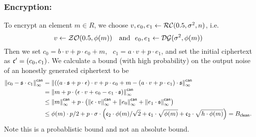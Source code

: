\subsubsection{Encryption:}
To encrypt an element $m\in R$, we choose $v, e_0, e_1 \leftarrow \mathcal{RC}(0.5,\sigma^2,n)$, i.e.
\[
v \leftarrow \mathcal{ZO}(0.5, \phi(m)) ~~~\mbox{and}~~ e_0,e_1 \leftarrow \mathcal{DG}(\sigma^2,\phi(m)) 
\]
Then we set $c_0 = b \cdot v + p \cdot e_0+m$,~ $c_1=a\cdot v+p\cdot
e_1$, and set the initial ciphertext as $\mathfrak{c}'=(c_0,c_1)$.
We calculate a bound (with high probability) on the output noise of
an honestly generated ciphertext to be
\begin{align*}
  {\Vert c_0 - \mathfrak{s}\cdot c_1 \Vert}_\infty^{\mathsf{can}} 
     &= {\Vert ((a \cdot \mathfrak{s}+ p \cdot \epsilon) \cdot v +p \cdot e_0 +m
                - (a \cdot v+ p \cdot e_1) \cdot \mathfrak{s}  \Vert}_\infty^{\mathsf{can}} \\
     &= {\Vert m + p \cdot (\epsilon \cdot v +e_0 - e_1 \cdot \mathfrak{s}) \Vert}_\infty^{\mathsf{can}} \\
     &\le {\Vert m \Vert}_\infty^{\mathsf{can}} 
         +p \cdot \left( {\Vert \epsilon\cdot v \Vert}_\infty^{\mathsf{can}}
                       + {\Vert e_0 \Vert}_\infty^{\mathsf{can}}
                       + {\Vert e_1 \cdot \mathfrak{s} \Vert}_\infty^{\mathsf{can}}
                  \right) \\
     &\le \phi(m) \cdot p/2
	  + p \cdot \sigma \cdot 
             \left( \mathfrak{c}_2 \cdot \phi(m) / \sqrt{2}
			  + \mathfrak{c}_1 \cdot \sqrt{\phi(m)}
			  + \mathfrak{c}_2 \cdot \sqrt{h \cdot \phi(m)}
		    \right) = B_{\mathsf{clean}}.
\end{align*}
Note this is a probablistic bound and not an absolute bound.

\vspace{5mm}

